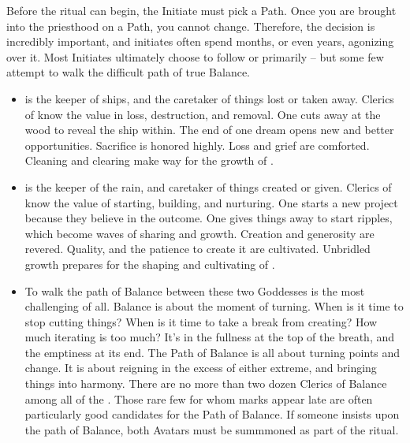 \documentclass[blue]{GL2020}
\begin{document}
Before the ritual can begin, the Initiate must pick a Path. Once you are brought into the priesthood on a Path, you cannot change. Therefore, the decision is incredibly important, and initiates often spend months, or even years, agonizing over it. Most Initiates ultimately choose to follow \cEbb{} or \cFlow{} primarily -- but some few attempt to walk the difficult path of true Balance. 
\begin{itemize}
  \item \cEbbFull{\full} is the keeper of ships, and the caretaker of things lost or taken away. Clerics of \cEbb{} know the value in loss, destruction, and removal. One cuts away at the wood to reveal the ship within. The end of one dream opens new and better opportunities. Sacrifice is honored highly. Loss and grief are comforted. Cleaning and clearing make way for the growth of \cFlow{}. 
  \item \cFlowFull{\full} is the keeper of the rain, and caretaker of things created or given. Clerics of \cFlow{} know the value of starting, building, and nurturing. One starts a new project because they believe in the outcome. One gives things away to start ripples, which become waves of sharing and growth. Creation and generosity are revered. Quality, and the patience to create it are cultivated. Unbridled growth prepares for the shaping and cultivating of \cEbb{}.
  \item To walk the path of Balance between these two Goddesses is the most challenging of all. Balance is about the moment of turning. When is it time to stop cutting things? When is it time to take a break from creating? How much iterating is too much? It's in the fullness at the top of the breath, and the emptiness at its end. The Path of Balance is all about turning points and change. It is about reigning in the excess of either extreme, and bringing things into harmony. There are no more than two dozen Clerics of Balance among all of the \pShippies{}. Those rare few for whom marks appear late are often particularly good candidates for the Path of Balance. If someone insists upon the path of Balance, both Avatars must be summmoned as part of the ritual.
\end{itemize}
\end{document}
